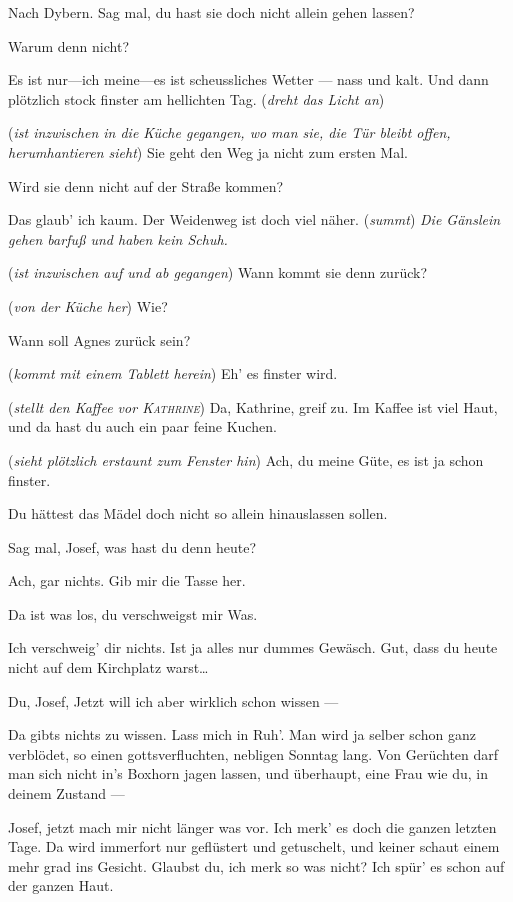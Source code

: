 \documentclass[
	final,
	a4paper,
	ngerman,
	mpinclude = true, %
	twoside = true,
	open = right,
	cleardoublepage = plain,
	DIV = 13,
	BCOR = 1cm,
	titlepage = firstiscover,
	]{scrbook}
\newcommand{\marginnote}[1]{\marginpar{\singlespacing\raggedright\footnotesize#1}}
\newcommand{\direction}[1]{(\textit{#1})}
\newcommand{\thecharacter}[1]{\textup{\textsc{#1}}\xspace}
\newcommand{\theBarbara}{\thecharacter{Barbara}}
\newcommand{\theJosef}{\thecharacter{Josef}}
\newcommand{\theKathrine}{\thecharacter{Kathrine}}
\newcommand{\character}[1]{\item[#1]}
\newcommand{\Barbara}{\character{\theBarbara}}
\newcommand{\Josef}{\character{\theJosef}}
\begin{document}
\begin{play}
\Josef
Nach Dybern. Sag mal, du hast sie doch nicht allein gehen lassen?

\Barbara
Warum denn nicht?

\Josef
Es ist nur---ich meine---es ist scheussliches Wetter --- nass und kalt. Und dann plötzlich stock finster am hellichten Tag. \direction{dreht das Licht an}

\Barbara
\direction{ist inzwischen in die Küche gegangen, wo man sie, die Tür bleibt offen, herumhantieren sieht} Sie geht den Weg ja nicht zum ersten Mal.

\Josef
Wird sie denn nicht auf der Straße kommen?

\Barbara
Das glaub' ich kaum. Der Weidenweg ist doch viel näher. \direction{summt} \emph{Die Gänslein gehen barfuß und haben kein Schuh.}

\Josef
\direction{ist inzwischen auf und ab gegangen} Wann kommt sie denn zurück?

\Barbara
\direction{von der Küche her} Wie?

\Josef
Wann soll Agnes zurück sein?

\Barbara
\direction{kommt mit einem Tablett herein} Eh' es finster wird.

\direction{stellt den Kaffee vor \theKathrine} Da, Kathrine, greif zu.
\marginnote{er ist stark}
Im Kaffee ist viel Haut, und da hast du auch ein paar feine Kuchen.

\direction{sieht plötzlich erstaunt zum Fenster hin}
Ach, du meine Güte, es ist ja schon finster.

\Josef
Du hättest das Mädel doch nicht so allein hinauslassen sollen.

\Barbara
Sag mal, Josef, was hast du denn heute?

\Josef
Ach, gar nichts. Gib mir die Tasse her.

\Barbara
Da ist was los, du verschweigst mir Was.

\Josef
Ich verschweig' dir nichts. Ist ja alles nur dummes Gewäsch. Gut, dass du heute nicht auf dem Kirchplatz warst\ldots

\Barbara
Du, Josef, Jetzt will ich aber wirklich schon wissen ---

\Josef
Da gibts nichts zu wissen. Lass mich in Ruh'. Man wird ja selber schon ganz verblödet, so einen gottsverfluchten, nebligen Sonntag lang. Von Gerüchten darf man sich nicht in's Boxhorn jagen lassen, und überhaupt, eine Frau wie du, in deinem Zustand ---

\Barbara
Josef, jetzt mach mir nicht länger was vor. Ich merk' es doch die ganzen letzten Tage. Da wird immerfort nur geflüstert und getuschelt, und keiner schaut einem mehr grad ins Gesicht. Glaubst du, ich merk so was nicht? Ich spür' es schon auf der ganzen Haut.


\end{play}
\end{document}
